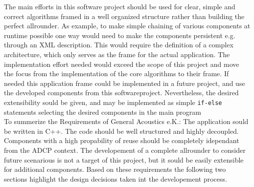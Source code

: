 The main efforts in this software project should be used for clear, simple and correct algorithms framed in a well organized structure rather than building the perfect allrounder. As example, to make simple chaining of various components at runtime possible one way would need to make the components persistent e.g. through an XML description. This would require the definition of a complex architecture, which only serves as the frame for the actual application. The implementation  effort needed would exceed the scope of this project and move the focus from the implementation of the core algorithms to their frame. If needed this application frame could be implemented in a future project, and use the developed components from this softwareproject. Nevertheless, the desired extensibility sould be given, and may be implemented as simple \texttt{if-else} statements selecting the desired components in the main program\\ 
To summerize the Requirements of General Acoustics e.K.: The application sould be written in C++. The code should be well structured and highly decoupled. Components with a high propability of reuse should be completely idependant from the ADCP context. The developement of a complete allrounder to consider future scenarious is not a target of this project, but it sould be easily extensible for additional components. Based on these requirements the following two sections highlight the design decisions taken int the developement process. 

